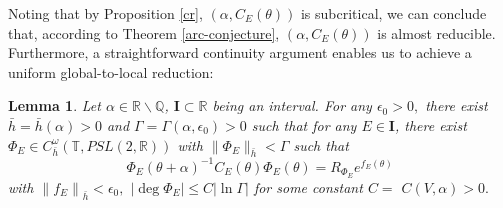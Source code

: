 \documentclass[11pt]{amsart}
\newtheorem{lemma}[theorem]{Lemma}
\theoremstyle{remark}
\theoremstyle{definition}
\newcommand{\I}{{\mathbf I}}
\newcommand{\Q}{{\mathbf Q}}
\newcommand{\R}{{\mathbf R}}
\def\R{{\mathbb R}}
\def\Q{{\mathbb Q}}
\begin{document}
Noting that by Proposition \ref{cr}, $ (\alpha, C_E(\theta)) $ is subcritical, we can conclude that, according to Theorem \ref{arc-conjecture}, $ (\alpha, C_E(\theta)) $ is almost reducible. Furthermore, a straightforward continuity argument enables us to achieve a uniform global-to-local reduction:

\begin{lemma}\label{global-local}\cite{GYZ,WXYZZ}
Let   $\alpha\in \R\backslash \Q$, \( \I \subset \mathbb{R} \) being an interval. For any $\epsilon_0>0,$ there exist
$\bar{h}=\bar{h}(\alpha)>0$ and $\Gamma=\Gamma(\alpha,\epsilon_0)>0$ such that for any $
E\in  \I$,
there exist $\Phi_{E}\in C^{\omega}_{\bar{h}}(\mathbb{T},PSL(2,\mathbb{R}))$ with $\|\Phi_{E}\|_{\bar{h}}<\Gamma$ such that
\begin{equation*}
    \Phi_{E}(\theta+ \alpha)^{-1}C_{E}(\theta)\Phi_{E}(\theta)=R_{\Phi_{E}}e^{f_{E}(\theta)}
\end{equation*}
with $\left\|f_{E}\right\|_{\bar{h}}<\epsilon_0,$ $\left|\operatorname{deg} \Phi_{E}\right| \leq C|\ln \Gamma|$ for some constant $C=$
$C(V,\alpha)>0 .$ 
\end{lemma}
\end{document}
